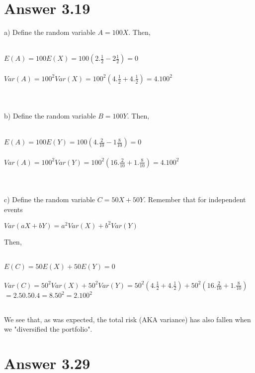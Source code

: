 \documentclass[12pt]{article}
\begin{document}
\section*{Answer 3.19}

a) Define the random variable $A=100X$. Then,\\\\
\begin{frame}

$E(A)=100E(X)=100(2.\frac{1}{2} - 2\frac{1}{2})=0$\\\\
$Var(A)=100^2Var(X)=100^2( 4.\frac{1}{2}+4.\frac{1}{2} ) =4.100^2$\\\\\\
\end{frame}
b) Define the random variable $B=100Y$. Then,\\\\
\begin{frame}

$E(A)=100E(Y)=100(4.\frac{2}{10} - 1\frac{8}{10})=0$\\\\
$Var(A)=100^2Var(Y)=100^2( 16.\frac{2}{10}+1.\frac{8}{10} )=4.100^2$\\\\\\
\end{frame}
c) Define the random variable $C=50X+50Y$. Remember that for independent events\\
\begin{center}
$Var(aX+bY)=a^2Var(X)+b^2Var(Y)$\\
\end{center}
Then,\\\\
\begin{frame}

$E(C)=50E(X)+50E(Y)=0$\\\\
$Var(C)=50^2Var(X)+50^2Var(Y)=50^2( 4.\frac{1}{2}+4.\frac{1}{2} )+50^2( 16.\frac{2}{10}+1.\frac{8}{10} )$\\
$=2.50.50.4=8.50^2=2.100^2$\\\\
\end{frame}
We see that, as was expected, the total risk (AKA variance) has also fallen when we "diversified the portfolio".



\section*{Answer 3.29}
\end{document}
